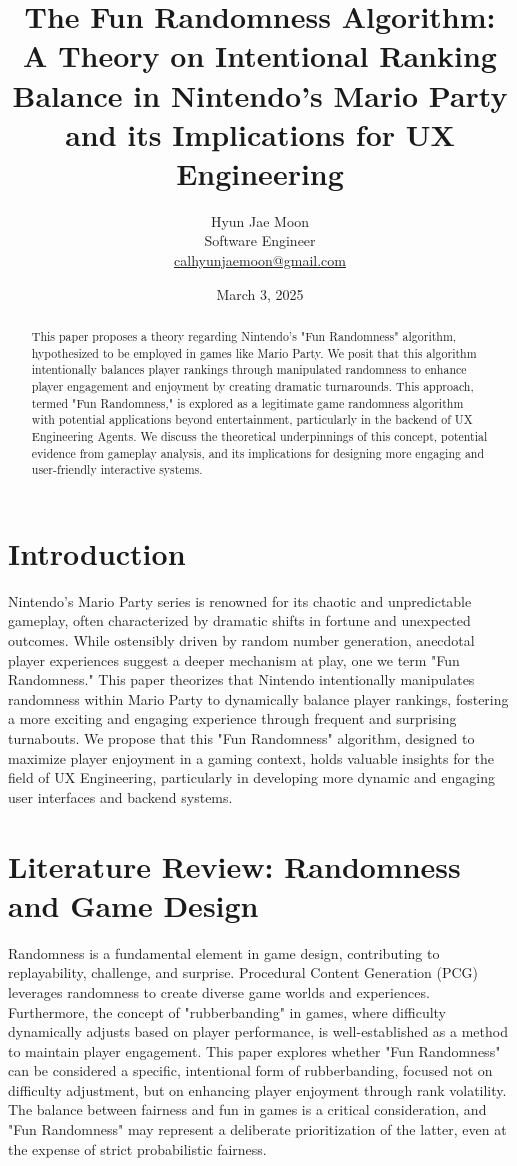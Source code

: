 \documentclass{article}
\title{The Fun Randomness Algorithm: A Theory on Intentional Ranking Balance in Nintendo's Mario Party and its Implications for UX Engineering}
\author{Hyun Jae Moon \\ \small Software Engineer \\ \small \href{mailto:calhyunjaemoon@gmail.com}{calhyunjaemoon@gmail.com}}
\date{March 3, 2025}
\begin{document}
\maketitle

\begin{abstract}
This paper proposes a theory regarding Nintendo's "Fun Randomness" algorithm, hypothesized to be employed in games like Mario Party. We posit that this algorithm intentionally balances player rankings through manipulated randomness to enhance player engagement and enjoyment by creating dramatic turnarounds.  This approach, termed "Fun Randomness," is explored as a legitimate game randomness algorithm with potential applications beyond entertainment, particularly in the backend of UX Engineering Agents. We discuss the theoretical underpinnings of this concept, potential evidence from gameplay analysis, and its implications for designing more engaging and user-friendly interactive systems.
\end{abstract}

\section{Introduction}

Nintendo's Mario Party series is renowned for its chaotic and unpredictable gameplay, often characterized by dramatic shifts in fortune and unexpected outcomes.  While ostensibly driven by random number generation, anecdotal player experiences suggest a deeper mechanism at play, one we term "Fun Randomness." This paper theorizes that Nintendo intentionally manipulates randomness within Mario Party to dynamically balance player rankings, fostering a more exciting and engaging experience through frequent and surprising turnabouts. We propose that this "Fun Randomness" algorithm, designed to maximize player enjoyment in a gaming context, holds valuable insights for the field of UX Engineering, particularly in developing more dynamic and engaging user interfaces and backend systems.

\section{Literature Review: Randomness and Game Design}

Randomness is a fundamental element in game design, contributing to replayability, challenge, and surprise. Procedural Content Generation (PCG) leverages randomness to create diverse game worlds and experiences.  Furthermore, the concept of "rubberbanding" in games, where difficulty dynamically adjusts based on player performance, is well-established as a method to maintain player engagement.  This paper explores whether "Fun Randomness" can be considered a specific, intentional form of rubberbanding, focused not on difficulty adjustment, but on enhancing player enjoyment through rank volatility.  The balance between fairness and fun in games is a critical consideration, and "Fun Randomness" may represent a deliberate prioritization of the latter, even at the expense of strict probabilistic fairness.
\end{document}
